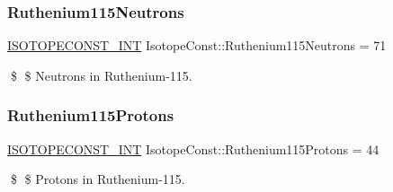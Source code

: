\subsubsection{\texorpdfstring{Ruthenium115\+Neutrons}{Ruthenium115Neutrons}}
{\footnotesize\ttfamily \mbox{\hyperlink{group___isotope_const-_macros_ga5f18360b3e99483a35c32d789e62621c}{I\+S\+O\+T\+O\+P\+E\+C\+O\+N\+S\+T\+\_\+\+I\+NT}} Isotope\+Const\+::\+Ruthenium115\+Neutrons = 71}

\$ \$ Neutrons in Ruthenium-\/115. \mbox{\label{group___isotope_const-_ruthenium-_ru115_gacef7bad76f0dcf7cef1ab2a095d853af}} 
\subsubsection{\texorpdfstring{Ruthenium115\+Protons}{Ruthenium115Protons}}
{\footnotesize\ttfamily \mbox{\hyperlink{group___isotope_const-_macros_ga5f18360b3e99483a35c32d789e62621c}{I\+S\+O\+T\+O\+P\+E\+C\+O\+N\+S\+T\+\_\+\+I\+NT}} Isotope\+Const\+::\+Ruthenium115\+Protons = 44}

\$ \$ Protons in Ruthenium-\/115. 